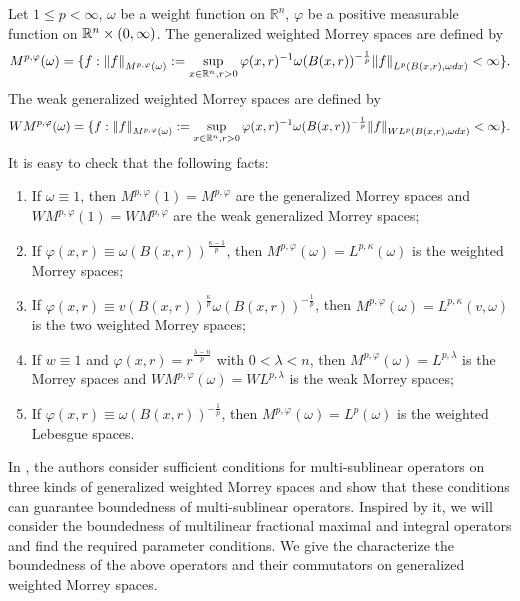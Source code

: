 \documentclass[11pt, twoside, leqno]{article}
\begin{document}
Let $1 \le p<\infty$, $\omega$ be a weight function on $\mathbb R^n$, $\varphi$ be a positive measurable function on ${\mathbb R^n} \times \left( {0,\infty } \right)$. The generalized weighted Morrey spaces are defined by
\begin{equation*}
{M^{p,\varphi }}(\omega ) = \{ f:{\left\| f \right\|_{{M^{p,\varphi }}(\omega )}}: = \mathop {\sup }\limits_{x \in {\mathbb R^n},r > 0} \varphi {(x,r)^{ - 1}}\omega {(B(x,r))^{ - \frac{1}{p}}}{\left\| f \right\|_{{L^p}(B(x,r),\omega dx)}} < \infty\}.
\end{equation*}
The weak generalized weighted Morrey spaces are defined by
\begin{equation*}
W{M^{p,\varphi }}(\omega ) = \{ f:{\left\| f \right\|_{{M^{p,\varphi }}(\omega )}}: = \mathop {\sup }\limits_{x \in {\mathbb R^n},r > 0} \varphi {(x,r)^{ - 1}}\omega {(B(x,r))^{ - \frac{1}{p}}}{\left\| f \right\|_{W{L^p}(B(x,r),\omega dx)}}< \infty\}.
\end{equation*}
It is easy to check that the following facts:
\begin{enumerate}
	\item[(i)] If $\omega \equiv 1$, then $M^{p,\varphi}(1)=M^{p,\varphi}$ are the generalized Morrey spaces and $WM^{p,\varphi}(1)=WM^{p,\varphi}$ are the weak generalized Morrey spaces;
	\item [(ii)] If $\varphi(x,r) \equiv \omega(B(x,r))^{\frac{\kappa-1}{p}}$, then $M^{p,\varphi}(\omega)=L^{p,\kappa}(\omega)$ is the weighted Morrey spaces;
	\item [(iii)] If  $\varphi(x,r) \equiv v(B(x,r))^{\frac{\kappa}{p}} \omega(B(x,r))^{-\frac{1}{p}}$, then
	$M^{p,\varphi}_{}(\omega)=L^{p,\kappa}_{}(v,\omega)$ is the two weighted Morrey spaces;
	\item [(iv)] If $w\equiv1$ and $\varphi(x,r)=r^{\frac{\lambda-n}{p}}$ with $0<\lambda<n$, then $M^{p,\varphi}(\omega)=L^{p,\lambda}$ is the Morrey spaces and $WM^{p,\varphi}(\omega)=WL^{p,\lambda}$ is the weak Morrey spaces;
	\item [(v)] If   $\varphi(x,r) \equiv \omega(B(x,r))^{-\frac{1}{p}}$, then $M^{p,\varphi}(\omega)=L^{p}(\omega)$ is the weighted Lebesgue spaces.
\end{enumerate}
In \cite{cen2}, the authors consider sufficient conditions for multi-sublinear operators on three kinds of generalized weighted Morrey spaces and show that these conditions can guarantee boundedness of multi-sublinear operators. Inspired by it, we will consider the boundedness of multilinear fractional maximal and integral operators and find the required parameter conditions. We give the characterize the boundedness of the above operators and their commutators on generalized weighted Morrey spaces.
\end{document}
